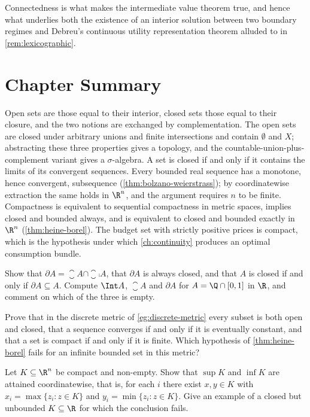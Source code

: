 Connectedness is what makes the intermediate value theorem true, and hence what
underlies both the existence of an interior solution between two boundary
regimes and Debreu's continuous utility representation theorem alluded to in
\autoref{rem:lexicographic}.

\section{Chapter Summary}\label{sec:top-summary}

Open sets are those equal to their interior, closed sets those equal to their
closure, and the two notions are exchanged by complementation. The open sets are
closed under arbitrary unions and finite intersections and contain
$\emptyset$ and $X$; abstracting these three properties gives a topology, and the
countable-union-plus-complement variant gives a $\sigma$-algebra. A set is closed
if and only if it contains the limits of its convergent sequences. Every bounded
real sequence has a monotone, hence convergent, subsequence
(\autoref{thm:bolzano-weierstrass}); by coordinatewise extraction the same holds
in $\R^n$, and the argument requires $n$ to be finite. Compactness is equivalent
to sequential compactness in metric spaces, implies closed and bounded always,
and is equivalent to closed and bounded exactly in $\R^n$
(\autoref{thm:heine-borel}). The budget set with strictly positive prices is
compact, which is the hypothesis under which \autoref{ch:continuity} produces an
optimal consumption bundle.

\begin{exercise}\label{ex:top-1}
	Show that $\partial A=\closure{A}\cap\closure{\comp A}$, that
	$\partial A$ is always closed, and that $A$ is closed if and only if
	$\partial A\subseteq A$. Compute $\Int A$, $\closure A$ and $\partial A$ for
	$A=\Q\cap[0,1]$ in $\R$, and comment on which of the three is empty.
\end{exercise}

\begin{exercise}\label{ex:top-2}
	Prove that in the discrete metric of \autoref{eg:discrete-metric} every subset
	is both open and closed, that a sequence converges if and only if it is
	eventually constant, and that a set is compact if and only if it is finite.
	Which hypothesis of \autoref{thm:heine-borel} fails for an infinite bounded set
	in this metric?
\end{exercise}

\begin{exercise}\label{ex:top-3}
	Let $K\subseteq\R^n$ be compact and non-empty. Show that $\sup K$ and $\inf K$
	are attained coordinatewise, that is, for each $i$ there exist
	$x,y\in K$ with $x_i=\max\{z_i : z\in K\}$ and $y_i=\min\{z_i: z\in K\}$. Give an
	example of a closed but unbounded $K\subseteq\R$ for which the conclusion fails.
\end{exercise}
